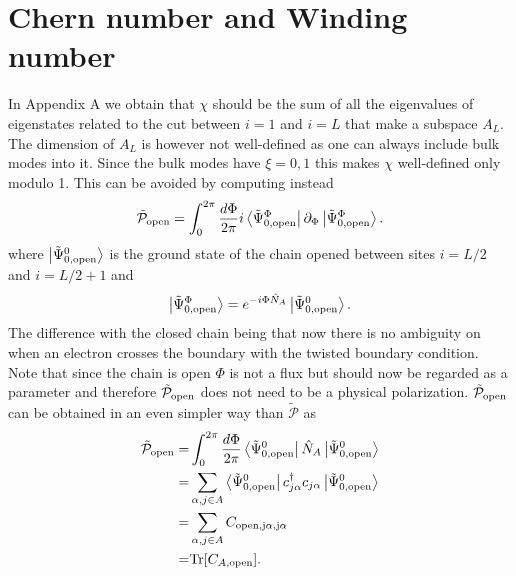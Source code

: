 \documentclass[twocolumn,amsmath,longbibliography,amssymb,superscriptaddress]{revtex4-1}
\begin{document}

\section{Chern number and Winding number}


In Appendix A we obtain that $\chi$ should be the sum of all the eigenvalues of eigenstates related to the cut between $i=1$ and $i=L$ that make a subspace $A_L$. The dimension of $A_L$ is however not well-defined as one can always include bulk modes into it. Since the bulk modes have $\xi = 0,1$ this makes $\chi$ well-defined only modulo 1. This can be avoided by computing instead
\begin{equation}
\tilde{\mathcal{P}}_{\rm open} = \int_0^{2\pi}\frac{d\Phi}{2\pi} i\bra{\tilde{\Psi}_{0,{\rm open}}^\Phi}\partial_\Phi \ket{\tilde{\Psi}_{0,{\rm open}}^\Phi}.
\end{equation}
where $\ket{\tilde{\Psi}_{0,{\rm open}}^0}$ is the ground state of the chain opened between sites $i=L/2$ and $i=L/2+1$ and 
\begin{equation}
\ket{\tilde{\Psi}_{0,{\rm open}}^\Phi} =e^{-i \Phi \hat{N}_A} \ket{\tilde{\Psi}_{0,{\rm open}}^0}.
\label{eq:gauge}
\end{equation}
The difference with the closed chain being that now there is no ambiguity on when an electron crosses the boundary with the twisted boundary condition. Note that since the chain is open $\Phi$ is not a flux but should now be regarded as a parameter and therefore $\tilde{\mathcal{P}}_{\rm open}$ does not need to be a physical polarization.  $\tilde{\mathcal{P}}_{\rm open}$ can be obtained in an even simpler way than $\tilde{\mathcal{P}}$ as
\begin{align*}
\tilde{\mathcal{P}}_{\rm open} =&  \int_0^{2\pi}\frac{d\Phi}{2\pi} \bra{\tilde{\Psi}_{0,{\rm open}}^0}  \hat{N}_A \ket{\tilde{\Psi}_{0,{\rm open}}^0} \\
=&\sum_{\alpha,j\in A}\bra{\tilde{\Psi}_{0,{\rm open}}^0} c_{j\alpha}^\dagger c_{j\alpha} \ket{\tilde{\Psi}_{0,{\rm open}}^0} \\
=&\sum_{\alpha,j\in A} C_{\rm open,j\alpha,j\alpha} \\
=& {\rm Tr}[C_{A,\rm open}].
\end{align*}
\end{document}
